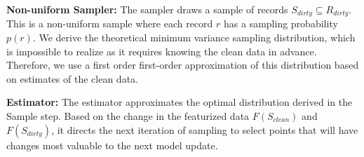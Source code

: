 \vspace{0.5em}

\noindent\textbf{Non-uniform Sampler: } The sampler draws a sample of records $S_{dirty} \subseteq R_{dirty}$. This is a non-uniform sample where each record $r$ has a sampling probability $p(r)$.
We derive the theoretical minimum variance sampling distribution, which is impossible to realize as it requires knowing the clean data in advance. Therefore, we use a first order first-order approximation of this distribution based on estimates of the clean data. 

\vspace{0.5em}

\noindent\textbf{Estimator: } The estimator approximates the optimal distribution derived in the Sample step. Based on the change in the featurized data $F(S_{clean})$ and $F(S_{dirty})$, it directs the next iteration of sampling to select points that will have changes most valuable to the next model update.



